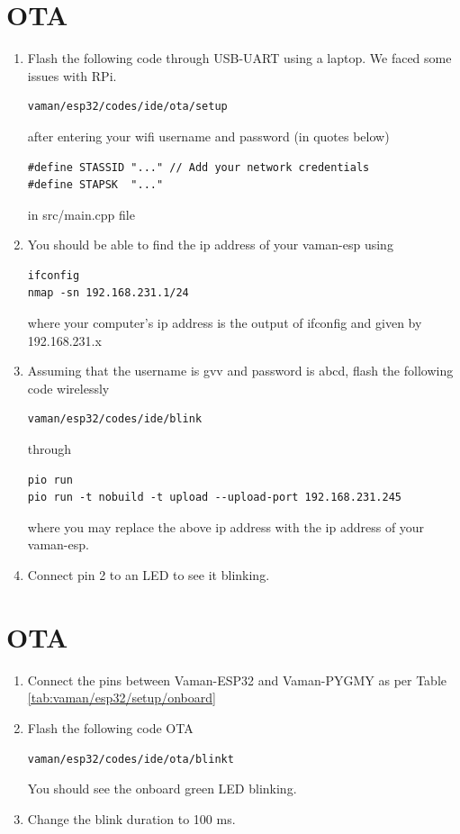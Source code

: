 \documentclass[journal,12pt,twocolumn]{IEEEtran}
\renewcommand\thesection{\arabic{section}}
\begin{document}
\section{OTA}
\renewcommand{\theequation}{\theenumi}
\renewcommand{\thefigure}{\theenumi}
\begin{enumerate}[label=\thesection.\arabic*.,ref=\thesection.\theenumi]
\item Flash the following code through USB-UART using a laptop.  We faced some issues with RPi.
\begin{lstlisting}
vaman/esp32/codes/ide/ota/setup
\end{lstlisting}
		after entering your wifi username and password (in quotes below)
\begin{lstlisting}
#define STASSID "..." // Add your network credentials
#define STAPSK  "..."
\end{lstlisting}
in src/main.cpp file
\item You should be able to find the ip address of your vaman-esp using 
\begin{lstlisting}
ifconfig
nmap -sn 192.168.231.1/24
\end{lstlisting}
where your computer's ip address is the output of ifconfig and given by 192.168.231.x
\item Assuming that the username is gvv and password is abcd, flash the following code wirelessly
\begin{lstlisting}
vaman/esp32/codes/ide/blink
\end{lstlisting}
through 
\begin{lstlisting}
pio run 
pio run -t nobuild -t upload --upload-port 192.168.231.245
\end{lstlisting}
where you may replace the above ip address with the ip address of your vaman-esp.
\item Connect pin 2 to an LED  to see it blinking.
\end{enumerate}
\section{OTA}
\renewcommand{\theequation}{\theenumi}
\renewcommand{\thefigure}{\theenumi}
\begin{enumerate}[label=\thesection.\arabic*.,ref=\thesection.\theenumi]
\item Connect the pins between Vaman-ESP32 and Vaman-PYGMY as per Table \ref{tab:vaman/esp32/setup/onboard}
\begin{table}[h]
\centering

\caption{}
\label{tab:vaman/esp32/setup/onboard}
\end{table}
\item Flash the following code OTA
\begin{lstlisting}
vaman/esp32/codes/ide/ota/blinkt
\end{lstlisting}
You should see the onboard green LED blinking.
\item Change the blink duration to 100 ms.
\end{enumerate}
\end{document}
